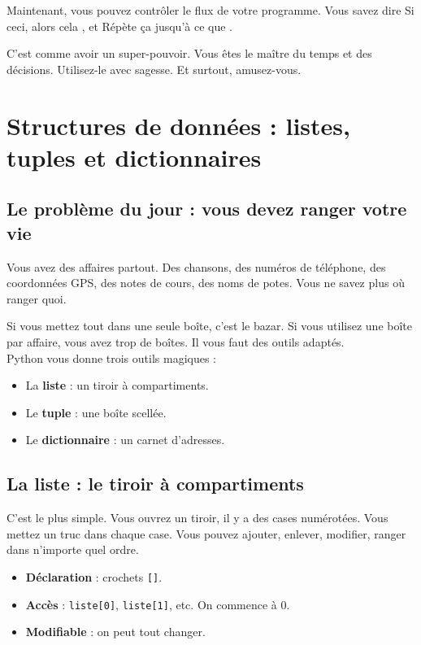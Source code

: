 \documentclass[12pt,a4paper]{article}
\begin{document}
Maintenant, vous pouvez contrôler le flux de votre programme. Vous savez dire \og Si ceci, alors cela \fg, et \og Répète ça jusqu'à ce que \fg.

C'est comme avoir un super-pouvoir. Vous êtes le maître du temps et des décisions. Utilisez-le avec sagesse. Et surtout, amusez-vous.



\section{Structures de données : listes, tuples et dictionnaires}

\subsection{Le problème du jour : vous devez ranger votre vie}

Vous avez des affaires partout. Des chansons, des numéros de téléphone, des coordonnées GPS, des notes de cours, des noms de potes. Vous ne savez plus où ranger quoi.

Si vous mettez tout dans une seule boîte, c'est le bazar. Si vous utilisez une boîte par affaire, vous avez trop de boîtes. Il vous faut des outils adaptés.\\

Python vous donne trois outils magiques :

\begin{itemize}
	\item [\ding{172}] La \textbf{liste} : un tiroir à compartiments.
	\item [\ding{173}] Le \textbf{tuple} : une boîte scellée.
	\item [\ding{174}] Le \textbf{dictionnaire} : un carnet d'adresses.
\end{itemize}

\subsection{La liste : le tiroir à compartiments}

C'est le plus simple. Vous ouvrez un tiroir, il y a des cases numérotées. Vous mettez un truc dans chaque case. Vous pouvez ajouter, enlever, modifier, ranger dans n'importe quel ordre.

\begin{itemize}
	\item [\ding{182}] \textbf{Déclaration} : crochets \texttt{[]}.
	\item [\ding{183}] \textbf{Accès} : \texttt{liste[0]}, \texttt{liste[1]}, etc. On commence à 0.
	\item [\ding{184}] \textbf{Modifiable} : on peut tout changer.
\end{itemize}
\end{document}
